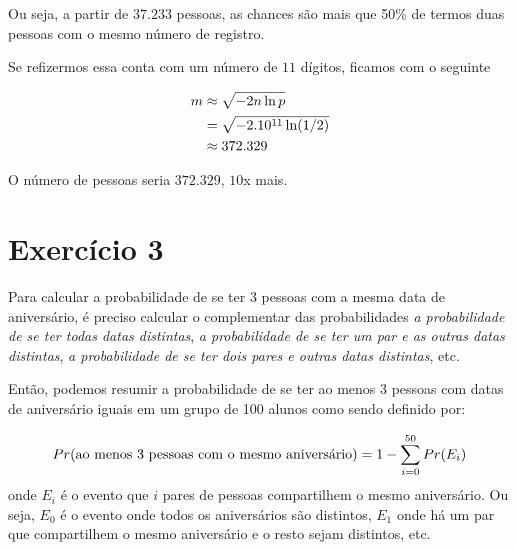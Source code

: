 \documentclass{article}
\begin{document}
Ou seja, a partir de $37.233$ pessoas, as chances são mais que 50\% 
de termos duas pessoas com o mesmo número de registro.

Se refizermos essa conta com um número de $11$ dígitos, ficamos com o seguinte

\begin{equation}
\notag
	\begin{split}
		m &\approx \sqrt{-2n \ln p}\\
		&= \sqrt{-2.10^{11} \ln (1/2)}\\
		&\approx 372.329
	\end{split}
\end{equation}

O número de pessoas seria $372.329$, $10$x mais.

\section{Exercício 3}
Para calcular a probabilidade de se ter 3 pessoas com a mesma data de aniversário, é
preciso calcular o complementar das probabilidades \emph{a probabilidade de se ter todas
 datas distintas}, \emph{a probabilidade de se ter um par e as outras datas distintas}, 
 \emph{a probabilidade de se ter dois pares e outras datas distintas}, etc.

Então, podemos resumir a probabilidade de se ter ao menos 3 pessoas com datas de 
aniversário iguais em um grupo de 100 alunos como sendo definido por:

\begin{equation}
	\notag
	Pr(\text{ao menos 3 pessoas com o mesmo aniversário}) = 1 - \sum\limits_{i=0}^{50} Pr(E_{i})
\end{equation}
onde $E_i$ é o evento que $i$ pares de pessoas compartilhem o mesmo aniversário. Ou seja,
$E_0$ é o evento onde todos os aniversários são distintos, $E_1$ onde há um par que 
compartilhem o mesmo aniversário e o resto sejam distintos, etc.
\end{document}
